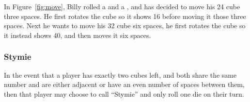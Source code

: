 \example In Figure~\ref{fig:move}, Billy rolled a  and a , and has decided to move his 24 cube three spaces. 
He first rotates the cube so it shows 16 before moving it those three spaces. 
Next he wants to move his 32 cube six spaces, he first rotates the cube so it instead shows 40, and then moves it six spaces.

\subsubsection{Stymie}
In the event that a player has exactly two cubes left, and both share the same number and are either adjacent or have an even number of spaces between them, then that player may choose to call ``Stymie'' and only roll one die on their turn.